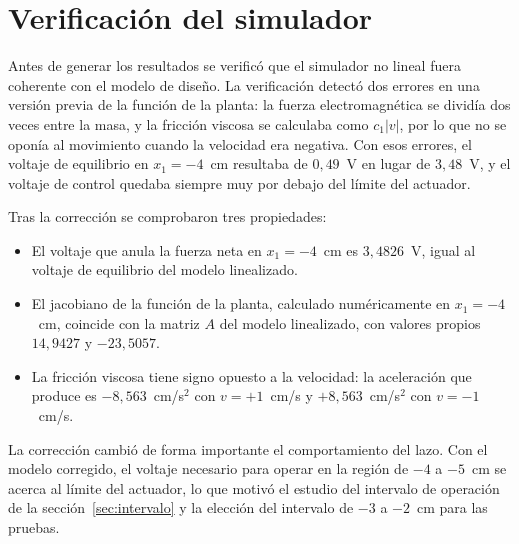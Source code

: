 \chapter{Verificación del simulador}\label{ap:verificacion}

Antes de generar los resultados se verificó que el simulador no lineal fuera coherente con el modelo de diseño. La verificación detectó dos errores en una versión previa de la función de la planta: la fuerza electromagnética se dividía dos veces entre la masa, y la fricción viscosa se calculaba como $c_1|v|$, por lo que no se oponía al movimiento cuando la velocidad era negativa. Con esos errores, el voltaje de equilibrio en $x_1=-4$~cm resultaba de $0{,}49$~V en lugar de $3{,}48$~V, y el voltaje de control quedaba siempre muy por debajo del límite del actuador.

Tras la corrección se comprobaron tres propiedades:

\begin{itemize}
  \item El voltaje que anula la fuerza neta en $x_1=-4$~cm es $3{,}4826$~V, igual al voltaje de equilibrio del modelo linealizado.
  \item El jacobiano de la función de la planta, calculado numéricamente en $x_1=-4$~cm, coincide con la matriz $A$ del modelo linealizado, con valores propios $14{,}9427$ y $-23{,}5057$.
  \item La fricción viscosa tiene signo opuesto a la velocidad: la aceleración que produce es $-8{,}563$~cm/s$^2$ con $v=+1$~cm/s y $+8{,}563$~cm/s$^2$ con $v=-1$~cm/s.
\end{itemize}

La corrección cambió de forma importante el comportamiento del lazo. Con el modelo corregido, el voltaje necesario para operar en la región de $-4$ a $-5$~cm se acerca al límite del actuador, lo que motivó el estudio del intervalo de operación de la sección~\ref{sec:intervalo} y la elección del intervalo de $-3$ a $-2$~cm para las pruebas.
